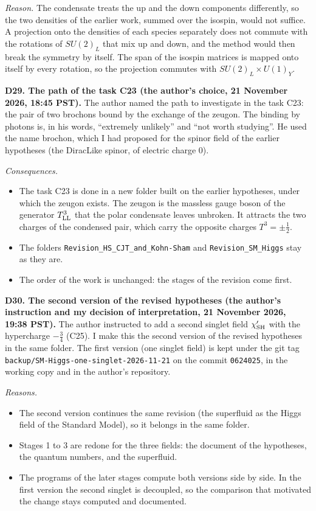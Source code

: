 \documentclass[
  10pt,
]{article}
\providecommand{\tightlist}{%
  \setlength{\itemsep}{0pt}\setlength{\parskip}{0pt}}
\begin{document}
\emph{Reason.} The condensate treats the up and the down components
differently, so the two densities of the earlier work, summed over the
isospin, would not suffice. A projection onto the densities of each
species separately does not commute with the rotations of \(SU(2)_L\)
that mix up and down, and the method would then break the symmetry by
itself. The span of the isospin matrices is mapped onto itself by every
rotation, so the projection commutes with \(SU(2)_L\times U(1)_Y\).

\textbf{D29. The path of the task C23 (the author's choice, 21 November
2026, 18:45 PST).} The author named the path to investigate in the task
C23: the pair of two brochons bound by the exchange of the zeugon. The
binding by photons is, in his words, ``extremely unlikely'' and ``not
worth studying''. He used the name brochon, which I had proposed for the
spinor field of the earlier hypotheses (the DiracLike spinor, of
electric charge 0).

\emph{Consequences.}

\begin{itemize}
\tightlist
\item
  The task C23 is done in a new folder built on the earlier hypotheses,
  under which the zeugon exists. The zeugon is the massless gauge boson
  of the generator \(T^3_{\rm LL}\) that the polar condensate leaves
  unbroken. It attracts the two charges of the condensed pair, which
  carry the opposite charges \(T^3=\pm\tfrac12\).
\item
  The folders \texttt{Revision\_HS\_CJT\_and\_Kohn-Sham} and
  \texttt{Revision\_SM\_Higgs} stay as they are.
\item
  The order of the work is unchanged: the stages of the revision come
  first.
\end{itemize}

\textbf{D30. The second version of the revised hypotheses (the author's
instruction and my decision of interpretation, 21 November 2026, 19:38
PST).} The author instructed to add a second singlet field
\(\chi'_{\rm SH}\) with the hypercharge \(-\tfrac34\) (C25). I make this
the second version of the revised hypotheses in the same folder. The
first version (one singlet field) is kept under the git tag
\texttt{backup/SM-Higgs-one-singlet-2026-11-21} on the commit
\texttt{0624025}, in the working copy and in the author's repository.

\emph{Reasons.}

\begin{itemize}
\tightlist
\item
  The second version continues the same revision (the superfluid as the
  Higgs field of the Standard Model), so it belongs in the same folder.
\item
  Stages 1 to 3 are redone for the three fields: the document of the
  hypotheses, the quantum numbers, and the superfluid.
\item
  The programs of the later stages compute both versions side by side.
  In the first version the second singlet is decoupled, so the
  comparison that motivated the change stays computed and documented.
\end{itemize}
\end{document}
